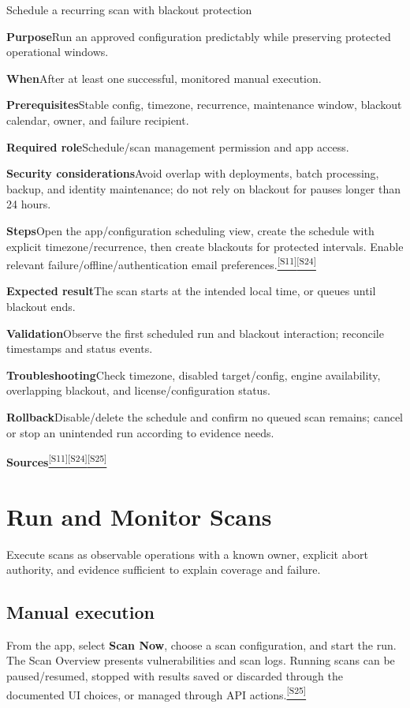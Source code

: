\documentclass[11pt,letterpaper,oneside]{scrreprt}
\newcommand{\src}[1]{\hyperref[src:#1]{\textsuperscript{\color{R7Orange}[#1]}}}
\newcommand{\uipath}[1]{\textsf{\textbf{#1}}}
\newcommand{\field}[1]{\par\smallskip\noindent\textbf{#1}\quad}
\newcommand{\chapterlead}[1]{\begin{tcolorbox}[enhanced,colback=R7Light,colframe=R7Light,boxrule=0pt,borderline west={3pt}{0pt}{R7Orange},arc=0pt,left=9pt,right=9pt,top=7pt,bottom=7pt]#1\end{tcolorbox}}
\begin{document}
\begin{procedure}{Schedule a recurring scan with blackout protection}
\field{Purpose}Run an approved configuration predictably while preserving protected operational windows.
\field{When}After at least one successful, monitored manual execution.
\field{Prerequisites}Stable config, timezone, recurrence, maintenance window, blackout calendar, owner, and failure recipient.
\field{Required role}Schedule/scan management permission and app access.
\field{Security considerations}Avoid overlap with deployments, batch processing, backup, and identity maintenance; do not rely on blackout for pauses longer than 24 hours.
\field{Steps}Open the app/configuration scheduling view, create the schedule with explicit timezone/recurrence, then create blackouts for protected intervals. Enable relevant failure/offline/authentication email preferences.\src{S11}\src{S24}
\field{Expected result}The scan starts at the intended local time, or queues until blackout ends.
\field{Validation}Observe the first scheduled run and blackout interaction; reconcile timestamps and status events.
\field{Troubleshooting}Check timezone, disabled target/config, engine availability, overlapping blackout, and license/configuration status.
\field{Rollback}Disable/delete the schedule and confirm no queued scan remains; cancel or stop an unintended run according to evidence needs.
\field{Sources}\src{S11}\src{S24}\src{S25}
\end{procedure}

\chapter{Run and Monitor Scans}
\chapterlead{Execute scans as observable operations with a known owner, explicit abort authority, and evidence sufficient to explain coverage and failure.}

\section{Manual execution}
From the app, select \uipath{Scan Now}, choose a scan configuration, and start the run. The Scan Overview presents vulnerabilities and scan logs. Running scans can be paused/resumed, stopped with results saved or discarded through the documented UI choices, or managed through API actions.\src{S25}
\end{document}
